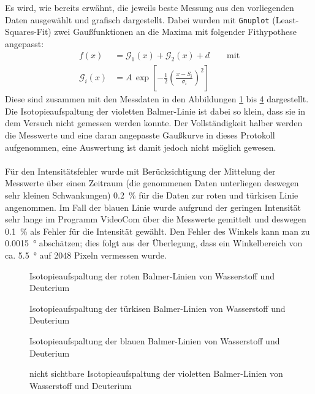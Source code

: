 \documentclass[11pt, a4paper]{article}
\numberwithin{equation}{section}
\begin{document}
Es wird, wie bereits erwähnt, die jeweils beste Messung aus den vorliegenden Daten ausgewählt und grafisch dargestellt.
Dabei wurden mit \texttt{Gnuplot} (Least-Squares-Fit) zwei Gaußfunktionen an die Maxima mit folgender Fithypothese angepasst:
\begin{align}
f(x)&=\mathcal{G}_1(x)+\mathcal{G}_2(x) + d\qquad\text{mit}\\
\mathcal{G}_i(x)&=A\,\exp\left[-\frac{1}{2}\left(\frac{x-S_i}{\sigma_i}\right)^2\right]
\label{eq:fithypothese_gauss}
\end{align}
Diese sind zusammen mit den Messdaten in den Abbildungen \ref{fig:aufspaltung_rot} bis  \ref{fig:aufspaltung_violett} dargestellt.
Die Isotopieaufspaltung der violetten Balmer-Linie ist dabei so klein, dass sie in dem Versuch nicht gemessen werden konnte.
Der Vollständigkeit halber werden die Messwerte und eine daran angepasste Gaußkurve in dieses Protokoll aufgenommen, eine Auswertung ist damit jedoch nicht möglich gewesen.\\
\\
Für den Intensitätsfehler wurde mit Berücksichtigung der Mittelung der Messwerte über einen Zeitraum (die genommenen Daten unterliegen deswegen sehr kleinen Schwankungen) \SI{0.2}{\percent} für die Daten zur roten und türkisen Linie angenommen.
Im Fall der blauen Linie wurde aufgrund der geringen Intensität sehr lange im Programm VideoCom über die Messwerte gemittelt und deswegen \SI{0.1}{\percent} als Fehler für die Intensität gewählt.
Den Fehler des Winkels kann man zu \SI{0.0015}{\degree} abschätzen; dies folgt aus der Überlegung, dass ein Winkelbereich von ca. \SI{5.5}{\degree} auf \num{2048} Pixeln vermessen wurde.
\begin{figure}[h]
\centering

\caption{Isotopieaufspaltung der roten Balmer-Linien von Wasserstoff und Deuterium}
\label{fig:aufspaltung_rot}
\end{figure}
\begin{figure}[h]
\centering

\caption{Isotopieaufspaltung der türkisen Balmer-Linien von Wasserstoff und Deuterium}
\label{fig:aufspaltung_tuerkis}
\end{figure}
\begin{figure}[h]
\centering

\caption{Isotopieaufspaltung der blauen Balmer-Linien von Wasserstoff und Deuterium}
\label{fig:aufspaltung_blau}
\end{figure}
\begin{figure}[h]
\centering

\caption{nicht sichtbare Isotopieaufspaltung der violetten Balmer-Linien von Wasserstoff und Deuterium}
\label{fig:aufspaltung_violett}
\end{figure}
\end{document}

